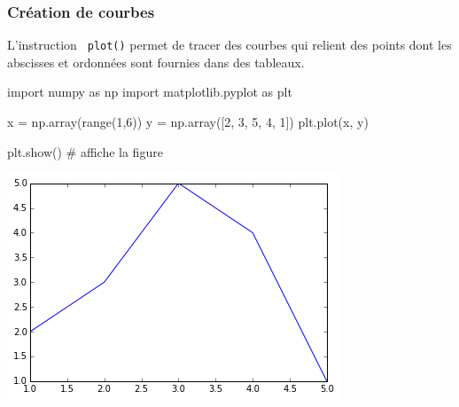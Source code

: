 \begin{frame}[fragile]
\frametitle{Création de courbes}

L'instruction \verb? plot()? permet de tracer des courbes qui relient des points dont les abscisses et ordonnées sont fournies dans des tableaux.

\begin{minipage}{0.5\linewidth}
\begin{GrayBox}[0.85\textwidth]
\begin{verbatimtab}[3]
import numpy as np
import matplotlib.pyplot as plt

x = np.array(range(1,6))
y = np.array([2, 3, 5, 4, 1])
plt.plot(x, y)

plt.show() # affiche la figure
\end{verbatimtab}
\end{GrayBox}
\end{minipage}\hfill
\begin{minipage}{0.46\linewidth}
\begin{center}
 \includegraphics[width=0.9\linewidth]{img/courbe0}
\end{center}
\end{minipage}

\end{frame}

